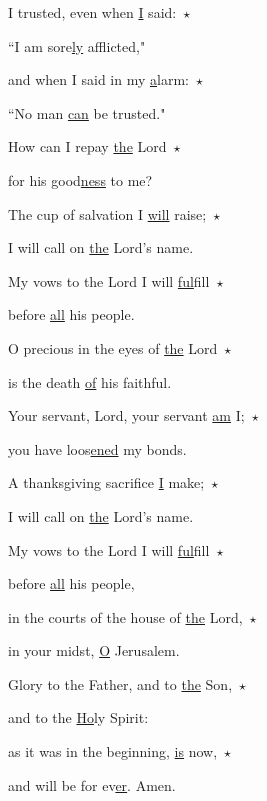 \noindent I trusted, even when \uline{I} said:~$\star$~\nopagebreak

``I am sore\uline{ly} afflicted,"

\noindent and when I said in my \uline{a}larm:~$\star$~\nopagebreak

``No man \uline{can} be trusted."

\noindent How can I repay \uline{the} Lord~$\star$~\nopagebreak

for his good\uline{ness} to me?

\noindent The cup of salvation I \uline{will} raise;~$\star$~\nopagebreak

I will call on \uline{the} Lord’s name.

\noindent My vows to the Lord I will \uline{ful}fill~$\star$~\nopagebreak

before \uline{all} his people.

\noindent O precious in the eyes of \uline{the} Lord~$\star$~\nopagebreak

is the death \uline{of} his faithful.

\noindent Your servant, Lord, your servant \uline{am} I;~$\star$~\nopagebreak

you have loos\uline{ened} my bonds.

\noindent A thanksgiving sacrifice \uline{I} make;~$\star$~\nopagebreak

I will call on \uline{the} Lord’s name.

\noindent My vows to the Lord I will \uline{ful}fill~$\star$~\nopagebreak

before \uline{all} his people,

\noindent in the courts of the house of \uline{the} Lord,~$\star$~\nopagebreak

in your midst, \uline{O} Jerusalem.

\noindent Glory to the Father, and to \uline{the} Son,~$\star$~\nopagebreak

and to the \uline{Ho}ly Spirit:

\noindent as it was in the beginning, \uline{is} now,~$\star$~\nopagebreak

and will be for ev\uline{er}. Amen.
